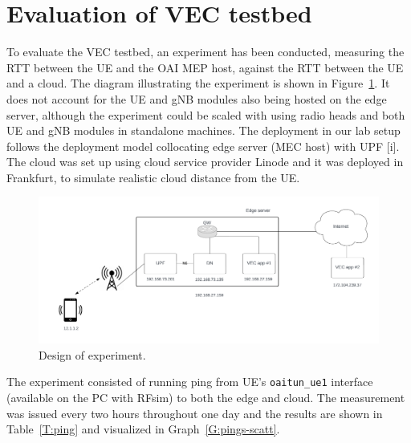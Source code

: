 \documentclass[12pt,a4paper,twoside]{report}
\begin{document}
\section{Evaluation of VEC testbed}
To evaluate the VEC testbed, an experiment has been conducted, measuring the RTT between the UE and the OAI MEP host, against the RTT between the UE and a cloud. The diagram illustrating the experiment is shown in Figure~\ref{F:experiment}. It does not account for the UE and gNB modules also being hosted on the edge server, although the experiment could be scaled with using radio heads and both UE and gNB modules in standalone machines. The deployment in our lab setup follows the deployment model collocating edge server (MEC host) with UPF [i]. The cloud was set up using cloud service provider Linode and it was deployed in Frankfurt, to simulate realistic cloud distance from the UE.
\begin{figure}[!ht]
	\centering
	\includegraphics[width=\textwidth]{./images/experiment.png} 
	\caption{Design of experiment.}
	\label{F:experiment}
\end{figure}
%
The experiment consisted of running ping from UE’s \verb|oaitun_ue1| interface (available on the PC with RFsim) to both the edge and cloud. The measurement was issued every two hours throughout one day and the results are shown in Table~\ref{T:ping} and visualized in Graph~\ref{G:pings-scatt}. 
\end{document}
